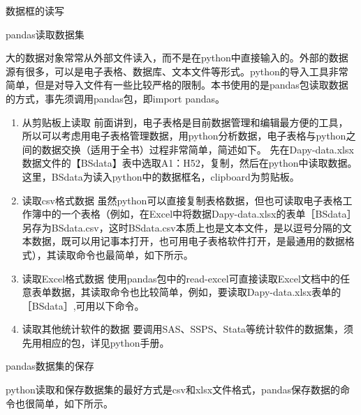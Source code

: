 \documentclass[ignorenonframetext,11pt,xcolor=dvipsnames,aspectratio=1610,hyperref={bookmarksdepth=4}]{beamer}
\providecommand{\tightlist}{%
  \setlength{\itemsep}{0pt}\setlength{\parskip}{0pt}}
\begin{document}
\begin{frame}{数据框的读写}
\protect\hypertarget{section-5}{}

\begin{block}{pandas读取数据集}

大的数据对象常常从外部文件读入，而不是在python中直接输入的。外部的数据源有很多，可以是电子表格、数据库、文本文件等形式。python的导入工具非常简单，但是对导入文件有一些比较严格的限制。本书使用的是pandas包读取数据的方式，事先须调用pandas包，即import
pandas。

\begin{enumerate}
\tightlist
\item
  从剪贴板上读取
  前面讲到，电子表格是目前数据管理和编辑最方便的工具，所以可以考虑用电子表格管理数据，用python分析数据，电子表格与python之间的数据交换（适用于全书）过程非常简单，简述如下。
  先在Dapy-data.xlsx数据文件的【BSdata】表中选取A1：H52，复制，然后在python中读取数据。
  这里，BSdata为读入python中的数据框名，clipboard为剪贴板。
\item
  读取csv格式数据
  虽然python可以直接复制表格数据，但也可读取电子表格工作簿中的一个表格（例如，在Excel中将数据Dapy-data.xlsx的表单［BSdata］另存为BSdata.csv，这时BSdata.csv本质上也是文本文件，是以逗号分隔的文本数据，既可以用记事本打开，也可用电子表格软件打开，是最通用的数据格式），其读取命令也最简单，如下所示。
\item
  读取Excel格式数据
  使用pandas包中的read-excel可直接读取Excel文档中的任意表单数据，其读取命令也比较简单，例如，要读取Dapy-data.xlsx表单的［BSdata］,可用以下命令。
\item
  读取其他统计软件的数据
  要调用SAS、SSPS、Stata等统计软件的数据集，须先用相应的包，详见python手册。
\end{enumerate}

\end{block}

\begin{block}{pandas数据集的保存}

python读取和保存数据集的最好方式是csv和xlsx文件格式，pandas保存数据的命令也很简单，如下所示。

\end{block}

\end{frame}
\end{document}
